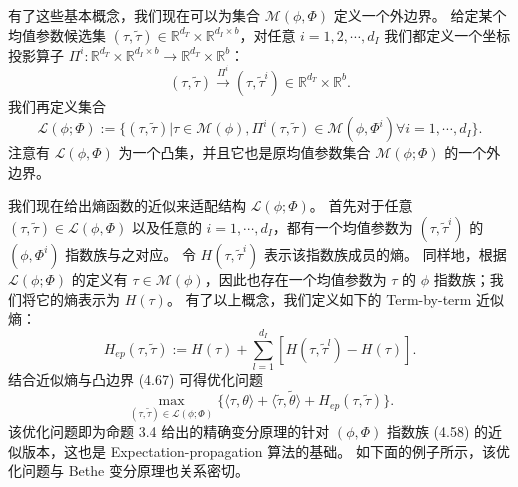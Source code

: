 有了这些基本概念，我们现在可以为集合 $\mathcal{M}(\phi, \Phi)$ 定义一个外边界。
给定某个均值参数候选集 $(\tau, \tilde{\tau}) \in \mathbb{R}^{d_T}\times\mathbb{R}^{d_I\times b}$，对任意 $i = 1, 2, \cdots, d_I$ 我们都定义一个坐标投影算子 $\Pi^i : \mathbb{R}^{d_T}\times\mathbb{R}^{d_I\times b} \rightarrow \mathbb{R}^{d_T}\times\mathbb{R}^b$：
\begin{equation*}
    (\tau, \tilde{\tau}) \xrightarrow{\Pi^i} (\tau, \tilde{\tau}^i) \in \mathbb{R}^{d_T}\times\mathbb{R}^b.
\end{equation*}
我们再定义集合
\begin{equation}
    \mathcal{L}(\phi; \Phi) := \{(\tau, \tilde{\tau})| \tau \in \mathcal{M}(\phi), \Pi^i(\tau, \tilde{\tau}) \in \mathcal{M}(\phi, \Phi^i) \forall i = 1, \cdots, d_I\}.
\end{equation}
注意有 $\mathcal{L}(\phi, \Phi)$ 为一个凸集，并且它也是原均值参数集合 $\mathcal{M}(\phi; \Phi)$ 的一个外边界。

我们现在给出熵函数的近似来适配结构 $\mathcal{L}(\phi; \Phi)$。
首先对于任意 $(\tau, \tilde{\tau}) \in \mathcal{L}(\phi, \Phi)$ 以及任意的 $i = 1, \cdots, d_I$，都有一个均值参数为 $(\tau, \tilde{\tau}^i)$ 的 $(\phi, \Phi^i)$ 指数族与之对应。
令 $H(\tau, \tilde{\tau}^i)$ 表示该指数族成员的熵。
同样地，根据 $\mathcal{L}(\phi; \Phi)$ 的定义有 $\tau \in \mathcal{M}(\phi)$，因此也存在一个均值参数为 $\tau$ 的 $\phi$ 指数族；我们将它的熵表示为 $H(\tau)$。
有了以上概念，我们定义如下的 Term-by-term 近似熵：
\begin{equation}
    H_{ep}(\tau, \tilde{\tau}) := H(\tau) + \sum_{l = 1}^{d_I}[H(\tau, \tilde{\tau}^l) - H(\tau)].
\end{equation}
结合近似熵与凸边界 (4.67) 可得优化问题
\begin{equation}
    \max_{(\tau, \tilde{\tau}) \in \mathcal{L}(\phi; \Phi)}\{\langle\tau, \theta\rangle + \langle\tilde{\tau}, \tilde{\theta}\rangle + H_{ep}(\tau, \tilde{\tau})\}.
\end{equation}
该优化问题即为命题 3.4 给出的精确变分原理的针对 $(\phi, \Phi)$ 指数族 (4.58) 的近似版本，这也是 Expectation-propagation 算法的基础。
如下面的例子所示，该优化问题与 Bethe 变分原理也关系密切。

